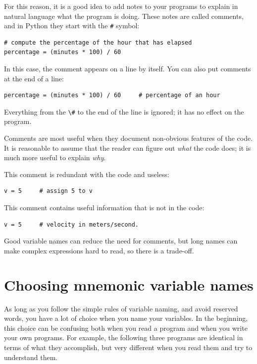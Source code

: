 For this reason, it is a good idea to add notes to your programs to explain in natural language what the program is doing. These notes are called comments, and in Python they start with the \texttt{\#} symbol:

\begin{Verbatim}[frame=single]
# compute the percentage of the hour that has elapsed
percentage = (minutes * 100) / 60
\end{Verbatim}

In this case, the comment appears on a line by itself. You can also put comments at the end of a line:

\begin{Verbatim}[frame=single]
percentage = (minutes * 100) / 60     # percentage of an hour
\end{Verbatim}

Everything from the \texttt{\textbackslash{}\#} to the end of the line is ignored; it has no effect on the program.

Comments are most useful when they document non-obvious features of the code. It is reasonable to assume that the reader can figure out \emph{what} the code does; it is much more useful to explain \emph{why}.

This comment is redundant with the code and useless:

\begin{Verbatim}[frame=single]
v = 5     # assign 5 to v
\end{Verbatim}

This comment contains useful information that is not in the code:

\begin{Verbatim}[frame=single]
v = 5     # velocity in meters/second.
\end{Verbatim}

Good variable names can reduce the need for comments, but long names can make complex expressions hard to read, so there is a trade-off.

\hypertarget{elecciuxf3n-de-nombres-de-variables-mnemuxf3nicos}{%
\section{Choosing mnemonic variable names}\label{elecciuxf3n-de-nombres-de-variables-mnemuxf3nicos}}


As long as you follow the simple rules of variable naming, and avoid reserved words, you have a lot of choice when you name your variables. In the beginning, this choice can be confusing both when you read a program and when you write your own programs. For example, the following three programs are identical in terms of what they accomplish, but very different when you read them and try to understand them.

